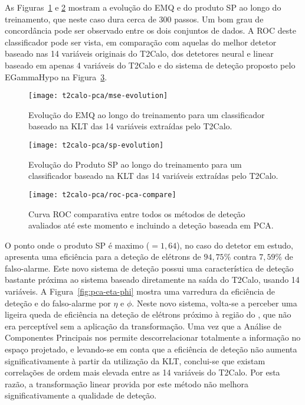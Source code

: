 As Figuras~\ref{fig:pca-mse-evo} e \ref{fig:pca-sp-evo} mostram a evolução do
EMQ e do produto SP ao longo do treinamento, que neste caso dura cerca de 300
passos. Um bom grau de concordância pode ser observado entre os dois conjuntos
de dados. A ROC deste classificador pode ser vista, em comparação com aquelas
do melhor detetor baseado nas 14 variáveis originais do T2Calo, dos detetores
neural e linear baseado em apenas 4 variáveis do T2Calo e do sistema de
deteção proposto pelo EGammaHypo na Figura~\ref{fig:pca-rocs}.

\begin{figure}
\begin{center}
\texttt{[image: t2calo-pca/mse-evolution]}
\end{center}
\caption{Evolução do EMQ ao longo do treinamento para um classificador baseado
na KLT das 14 variáveis extraídas pelo T2Calo.}
\label{fig:pca-mse-evo}
\end{figure}

\begin{figure}
\begin{center}
\texttt{[image: t2calo-pca/sp-evolution]}
\end{center}
\caption{Evolução do Produto SP ao longo do treinamento para um classificador
baseado na KLT das 14 variáveis extraídas pelo T2Calo.}
\label{fig:pca-sp-evo}
\end{figure}

\begin{figure}
\begin{center}
\texttt{[image: t2calo-pca/roc-pca-compare]}
\end{center}
\caption{Curva ROC comparativa entre todos os métodos de deteção avaliados até
este momento e incluindo a deteção baseada em PCA.}
\label{fig:pca-rocs}
\end{figure}

O ponto onde o produto SP é maximo ($=1,64$), no caso do detetor em estudo,
apresenta uma eficiência para a deteção de elétrons de $94,75$\% contra
$7,59$\% de falso-alarme. Este novo sistema de deteção possui uma
característica de deteção bastante próxima ao sistema baseado diretamente na
saída do T2Calo, usando 14 variáveis. A Figura~\ref{fig:pca-eta-phi} mostra
uma varredura da eficiência de deteção e do falso-alarme por $\eta$ e
$\phi$. Neste novo sistema, volta-se a perceber uma ligeira queda de
eficiência na deteção de elétrons próximo à região do , que não era
perceptível sem a aplicação da transformação. Uma vez que a Análise de
Componentes Principais nos permite descorrelacionar totalmente a informação no
espaço projetado, e levando-se em conta que a eficiência de deteção não
aumenta significativamente à partir da utilização da KLT, conclui-se que
existam correlações de ordem mais elevada entre as 14 variáveis do T2Calo. Por
esta razão, a transformação linear provida por este método não melhora
significativamente a qualidade de deteção.

